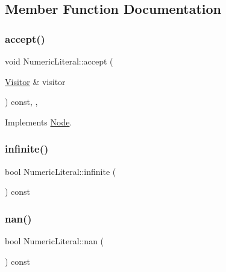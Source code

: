 \subsection{Member Function Documentation}
\mbox{\label{struct_numeric_literal_aa18c06c1b739ba725cad0593c6bde1f4}} 
\subsubsection{\texorpdfstring{accept()}{accept()}}
{\footnotesize\ttfamily void Numeric\+Literal\+::accept (\begin{DoxyParamCaption}\item[{\hyperlink{struct_visitor}{Visitor} \&}]{visitor }\end{DoxyParamCaption}) const\hspace{0.3cm}{\ttfamily [inline]}, {\ttfamily [override]}, {\ttfamily [virtual]}}



Implements \hyperlink{struct_node_a10bd7af968140bbf5fa461298a969c71}{Node}.

\mbox{\label{struct_numeric_literal_ae14a02de1106d09cd661b18deee1ac2e}} 
\subsubsection{\texorpdfstring{infinite()}{infinite()}}
{\footnotesize\ttfamily bool Numeric\+Literal\+::infinite (\begin{DoxyParamCaption}{ }\end{DoxyParamCaption}) const\hspace{0.3cm}{\ttfamily [inline]}}

\mbox{\label{struct_numeric_literal_a108e1c9532a08efac5e3cc1dca724c19}} 
\subsubsection{\texorpdfstring{nan()}{nan()}}
{\footnotesize\ttfamily bool Numeric\+Literal\+::nan (\begin{DoxyParamCaption}{ }\end{DoxyParamCaption}) const\hspace{0.3cm}{\ttfamily [inline]}}

